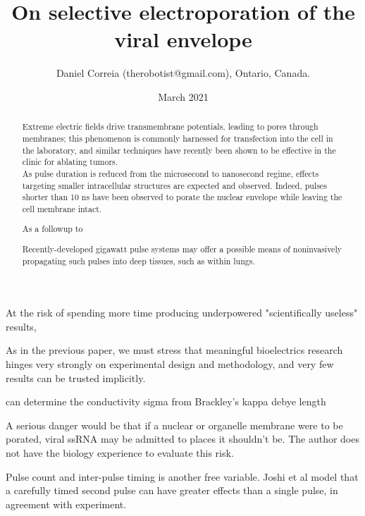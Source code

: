 \documentclass[fleqn,10pt]{article}
\begin{document}
\title{On selective electroporation of the viral envelope}
\author{\small{Daniel Correia (therobotist@gmail.com), Ontario, Canada.}}
\date{March 2021}

\flushbottom 
\maketitle
\thispagestyle{empty}

\renewcommand{\abstractname}{Summary}    %



\begin{abstract}
	\noindent Extreme electric fields drive transmembrane potentials, leading to pores through membranes; this phenomenon is commonly harnessed for transfection into the cell in the laboratory, and similar techniques have recently been shown to be effective in the clinic for ablating tumors.\\
	
	\noindent As pulse duration is reduced from the microsecond to nanosecond regime, effects targeting smaller intracellular structures are expected and observed. Indeed, pulses shorter than 10 ns have been observed to porate the nuclear envelope while leaving the cell membrane intact.
	
	As a followup to 
	
	Recently-developed gigawatt pulse systems may offer a possible means of noninvasively propagating such pulses into deep tissues, such as within lungs. 
\end{abstract}

At the risk of spending more time producing underpowered "scientifically useless" results, 

As in the previous paper, we must stress that meaningful bioelectrics research hinges very strongly on experimental design and methodology, and very few results can be trusted implicitly.



can determine the conductivity sigma from Brackley's kappa debye length

A serious danger would be that if a nuclear or organelle membrane were to be porated, viral ssRNA may be admitted to places it shouldn't be. The author does not have the biology experience to evaluate this risk.

Pulse count and inter-pulse timing is another free variable. Joshi et al \cite{Selfconsistent2001} model that a carefully timed second pulse can have greater effects than a single pulse, in agreement with experiment.
\end{document}
